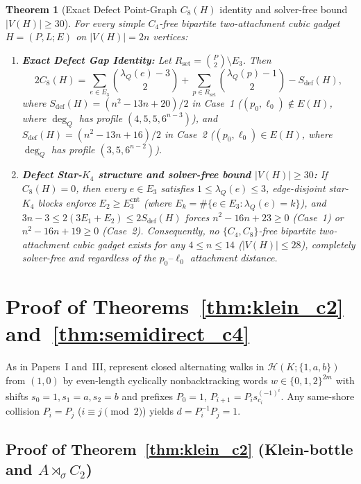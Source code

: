 \documentclass[11pt]{amsart}
\newtheorem{theorem}{Theorem}[section]
\theoremstyle{definition}
\theoremstyle{remark}
\newcommand{\Haar}{\mathcal{H}}
\begin{document}
\begin{theorem}[Exact Defect Point-Graph $C_8(H)$ identity and solver-free bound $|V(H)| \ge 30$]\label{thm:defect_gap}
For every simple $C_4$-free bipartite two-attachment cubic gadget $H = (P, L; E)$ on $|V(H)| = 2n$ vertices:
\begin{enumerate}[label=(\alph*)]
\item \textbf{Exact Defect Gap Identity:} Let $R_{\mathrm{set}} = \binom{P}{2} \setminus E_3$. Then
\[
2 C_8(H) = \sum_{e \in E_3} \binom{\lambda_Q(e) - 3}{2} + \sum_{p \in R_{\mathrm{set}}} \binom{\lambda_Q(p) - 1}{2} - S_{\mathrm{def}}(H),
\]
where $S_{\mathrm{def}}(H) = (n^2 - 13n + 20)/2$ in Case~1 ($(p_0, \ell_0) \notin E(H)$, where $\deg_Q$ has profile $(4, 5, 5, 6^{n-3})$), and $S_{\mathrm{def}}(H) = (n^2 - 13n + 16)/2$ in Case~2 ($(p_0, \ell_0) \in E(H)$, where $\deg_Q$ has profile $(3, 5, 6^{n-2})$).
\item \textbf{Defect Star-$K_4$ structure and solver-free bound $|V(H)| \ge 30$:} If $C_8(H) = 0$, then every $e \in E_3$ satisfies $1 \le \lambda_Q(e) \le 3$, edge-disjoint star-$K_4$ blocks enforce $E_2 \ge E_3^{\mathrm{cnt}}$ (where $E_k = \#\{e \in E_3 : \lambda_Q(e) = k\}$), and $3n - 3 \le 2(3 E_1 + E_2) \le 2 S_{\mathrm{def}}(H)$ forces $n^2 - 16n + 23 \ge 0$ (Case~1) or $n^2 - 16n + 19 \ge 0$ (Case~2). Consequently, no $\{C_4, C_8\}$-free bipartite two-attachment cubic gadget exists for any $4 \le n \le 14$ ($|V(H)| \le 28$), completely solver-free and regardless of the $p_0\text{--}\ell_0$ attachment distance.
\end{enumerate}
\end{theorem}

\section{Proof of Theorems~\ref{thm:klein_c2} and~\ref{thm:semidirect_c4}}

As in Papers~I and~III, represent closed alternating walks in $\Haar(K; \{1,a,b\})$ from $(1,0)$ by even-length cyclically nonbacktracking words $w \in \{0,1,2\}^{2m}$ with shifts $s_0 = 1, s_1 = a, s_2 = b$ and prefixes $P_0 = 1$, $P_{i+1} = P_i s_{c_i}^{(-1)^i}$. Any same-shore collision $P_i = P_j$ ($i \equiv j \pmod 2$) yields $d = P_i^{-1} P_j = 1$.

\subsection{Proof of Theorem~\ref{thm:klein_c2} (Klein-bottle and $A \rtimes_\sigma C_2$)}
\end{document}
